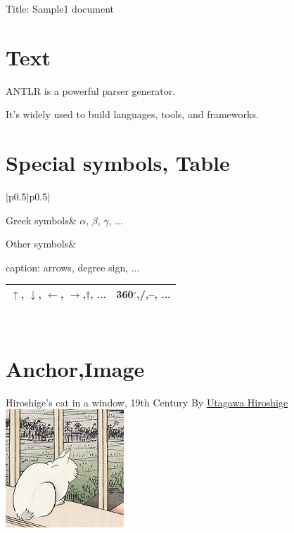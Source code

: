\documentclass[pdflatex, a4paper, 10pt, jadriver=standard]{bxjsarticle}
\begin{document}
    
        {\Large Title: Sample1 document}\newline\newline
    
\section*{\Large Text}
	ANTLR is a powerful parser generator.\par
	It's widely used to build languages, tools, and frameworks.\par
  
\section*{\Large Special symbols, Table}
\begin{tabular}{|p{}|p{}|}\hline 
		
			Greek symbols&
			$\alpha$, $\beta$, $\gamma$, ...
		\\\hline 
		
			Other symbols&
			
caption: arrows, degree sign, ...\newline 
\begin{tabular}{|p{}|p{}|}\hline 
				
				
					$\uparrow$, $\downarrow$, $\leftarrow$, $\rightarrow$,$\dagger$, ...&
					360$^\circ$,/,--, ...
				\\\hline 
			\end{tabular}
			
		\\\hline 
	\end{tabular}
\newline
	
 \section*{\Large Anchor,Image}
	Hiroshige's cat in a window, 19th Century By 
		 \href{https://en.wikipedia.org/wiki/Hiroshige}{Utagawa Hiroshige}
\newline
\newline
\includegraphics{cat.png}
 
\end{document}
